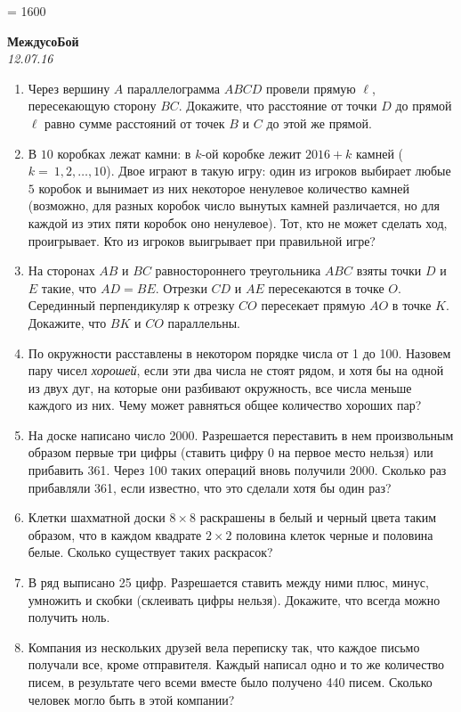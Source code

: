 \tolerance = 1600

\begin{center}
\textbf{\Large МеждусоБой}\\
\textit{12.07.16}
\end{center}

\begin{enumerate}
\item Через вершину $A$ параллелограмма $ABCD$ провели прямую $\ell$, пересекающую сторону $BC$. Докажите, что расстояние от точки $D$ до прямой $\ell$ равно сумме расстояний от точек $B$ и $C$ до этой же прямой. 

\item В $10$ коробках лежат камни: в $k$-ой коробке лежит $2016+k$ камней ($k=~1,2,\ldots,10$). Двое играют в такую игру: один из игроков выбирает любые $5$ коробок и вынимает из них некоторое ненулевое количество камней (возможно, для разных коробок число вынутых камней различается, но для каждой из этих пяти коробок оно ненулевое). Тот, кто не может сделать ход, проигрывает. Кто из игроков выигрывает при правильной игре?

\item На сторонах $AB$ и $BC$ равностороннего треугольника $ABC$ взяты точки $D$ и $E$ такие, что $AD = BE$. Отрезки $CD$ и $AE$  пересекаются в точке $O$. Серединный перпендикуляр к отрезку  $CO$ пересекает прямую $AO$ в точке $K$. Докажите, что $BK$ и $CO$ параллельны.

\item По окружности расставлены в некотором порядке числа от 1 до 100. 
Назовем пару чисел {\it хорошей}, если эти два числа не стоят рядом, и хотя бы 
на одной из двух дуг, на которые они разбивают окружность, все числа 
меньше каждого из них. Чему может равняться общее количество хороших пар?

\item На доске написано число 2000. Разрешается переставить в нем произвольным образом первые три цифры (ставить цифру 0 на первое место нельзя) или прибавить 361. Через 100 таких операций вновь получили 2000. Сколько раз прибавляли 361, если известно, что это сделали хотя бы один раз? 

\item Клетки шахматной доски $8 \times 8$ раскрашены в белый и черный цвета таким образом, что в каждом квадрате $2 \times 2$ половина клеток черные и половина белые. Сколько существует таких раскрасок?

\item В ряд выписано 25 цифр. Разрешается ставить между ними плюс, минус, умножить и скобки (склеивать цифры нельзя). Докажите, что всегда можно получить ноль.

\item Компания из нескольких друзей вела переписку так, что каждое письмо получали все, кроме отправителя. Каждый написал одно и то же количество писем, в результате чего всеми вместе было получено 440 писем. Сколько человек могло быть в этой компании?
\end{enumerate}

